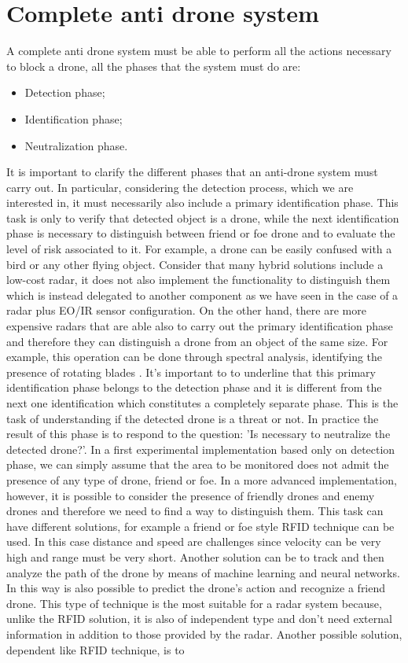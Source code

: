 \section{Complete anti drone system}
A complete anti drone system must be able to perform all the actions necessary to block a drone, all the phases that the system must do are:
\begin{itemize}
     \item Detection phase;
         
    \item Identification phase;
        
    \item Neutralization phase.
\end{itemize}
It is important to clarify the different phases that an anti-drone system must carry out. In particular, considering the detection process, which we are interested in, it must necessarily also include a primary identification phase. This task is only to verify that detected object is a drone, while the next identification phase is necessary to distinguish between friend or foe drone and to evaluate the level of risk associated to it. For example, a drone can be easily confused with a bird or any other flying object. Consider that many hybrid solutions include a low-cost radar, it does not also implement the functionality to distinguish them which is instead delegated to another component as we have seen in the case of a radar plus EO/IR sensor configuration. On the other hand, there are more expensive radars that are able also to carry out the primary identification phase and therefore they can distinguish a drone from an object of the same size. For example, this operation can be done through spectral analysis, identifying the presence of rotating blades \cite{robinradar2}. It's important to to underline that this primary identification phase belongs to the detection phase and it is different from the next one identification which constitutes a completely separate phase. This is the task of understanding if the detected drone is a threat or not. In practice the result of this phase is to respond to the question: 'Is necessary to neutralize the detected drone?'. In a first experimental implementation based only on detection phase, we can simply assume that the area to be monitored does not admit the presence of any type of drone, friend or foe. In a more advanced implementation, however, it is possible to consider the presence of friendly drones and enemy drones and therefore we need to find a way to distinguish them. This task can have different solutions, for example a friend or foe style RFID technique can be used. In this case distance and speed are challenges since velocity can be very high and range must be very short. Another solution can be to track and then analyze the path of the drone by means of machine learning and neural networks. In this way is also possible to predict the drone's action and recognize a friend drone. This type of technique is the most suitable for a radar system because, unlike the RFID solution, it is also of independent type and don't need external information in addition to those provided by the radar. Another possible solution, dependent like RFID technique, is to 